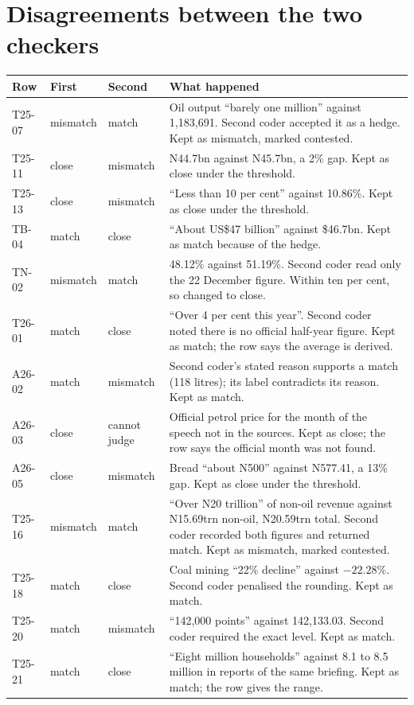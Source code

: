 \documentclass[11pt]{article}
\newcommand{\N}{N}
\begin{document}
\section{Disagreements between the two checkers}
\label{sec:disagree}

{\small
\begin{tabularx}{\linewidth}{@{}l l l X@{}}
\toprule
Row & First & Second & What happened \\
\midrule
T25-07 & mismatch & match & Oil output ``barely one million'' against 1,183,691. Second coder accepted it as a hedge. Kept as mismatch, marked contested. \\
T25-11 & close & mismatch & \N 44.7bn against \N 45.7bn, a 2\% gap. Kept as close under the threshold. \\
T25-13 & close & mismatch & ``Less than 10 per cent'' against 10.86\%. Kept as close under the threshold. \\
TB-04 & match & close & ``About US\$47 billion'' against \$46.7bn. Kept as match because of the hedge. \\
TN-02 & mismatch & match & 48.12\% against 51.19\%. Second coder read only the 22 December figure. Within ten per cent, so changed to close. \\
T26-01 & match & close & ``Over 4 per cent this year''. Second coder noted there is no official half-year figure. Kept as match; the row says the average is derived. \\
A26-02 & match & mismatch & Second coder's stated reason supports a match (118 litres); its label contradicts its reason. Kept as match. \\
A26-03 & close & cannot judge & Official petrol price for the month of the speech not in the sources. Kept as close; the row says the official month was not found. \\
A26-05 & close & mismatch & Bread ``about \N 500'' against \N 577.41, a 13\% gap. Kept as close under the threshold. \\
T25-16 & mismatch & match & ``Over \N 20 trillion'' of non-oil revenue against \N 15.69trn non-oil, \N 20.59trn total. Second coder recorded both figures and returned match. Kept as mismatch, marked contested. \\
T25-18 & match & close & Coal mining ``22\% decline'' against $-22.28$\%. Second coder penalised the rounding. Kept as match. \\
T25-20 & match & mismatch & ``142,000 points'' against 142,133.03. Second coder required the exact level. Kept as match. \\
T25-21 & match & close & ``Eight million households'' against 8.1 to 8.5 million in reports of the same briefing. Kept as match; the row gives the range. \\
\bottomrule
\end{tabularx}}
\end{document}
